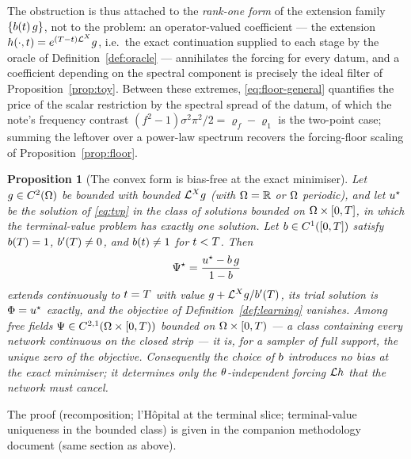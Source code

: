 \documentclass[11pt]{article}
\newcommand{\modeDecayRate}[1]{\varrho_{#1}} %
\theoremstyle{plain}
\newtheorem{proposition}[theorem]{Proposition}
\theoremstyle{definition}
\theoremstyle{remark}
\begin{document}
The obstruction is thus attached to the \emph{rank-one form} of the extension
family $\{b(t)\,g\}$, not to the
problem: an operator-valued coefficient --- the extension
$h(\cdot,t)=e^{(T-t)\mathcal{L}^{X}}g$,
i.e.\ the exact continuation supplied to each stage by the oracle of
Definition~\ref{def:oracle} --- annihilates the forcing for every datum, and a
coefficient depending on the spectral component is precisely the ideal filter of
Proposition~\ref{prop:toy}. Between these extremes, \eqref{eq:floor-general}
quantifies the price of the scalar restriction by the spectral spread of the
datum, of which the note's frequency contrast
$(f^{2}-1)\sigma^{2}\pi^{2}/2=\modeDecayRate{f}-\modeDecayRate{1}$ is the
two-point case; summing the leftover over a power-law spectrum recovers the
forcing-floor scaling of Proposition~\ref{prop:floor}.

\begin{proposition}[The convex form is bias-free at the exact minimiser]\label{prop:nobias}
Let $g\in C^{2}(\Omega)$ be bounded with bounded
$\mathcal{L}^{X}g$ (with $\Omega=\mathbb{R}$ or $\Omega$ periodic), and let
$u^{\star}$ be the solution of \eqref{eq:tvp} in the class of
solutions bounded on $\Omega\times[0,T]$, in which the
terminal-value problem has exactly one solution. Let
$b\in C^{1}([0,T])$ satisfy
$b(T)=1$,
$b'(T)\neq0$, and
$b(t)\neq1$ for $t<T$. Then
\begin{equation*}
  \Psi^{\star}
  =\frac{u^{\star}-b\,g}
        {1-b}
\end{equation*}
extends continuously to $t=T$ with value
$g+\mathcal{L}^{X}g/b'(T)$,
its trial solution is $\Phi=u^{\star}$ exactly, and the
objective of Definition~\ref{def:learning} vanishes. Among free fields
$\Psi\in C^{2,1}(\Omega\times[0,T))$ bounded on
$\Omega\times[0,T)$ --- a class containing every network continuous
on the closed strip --- it is, for a sampler of full support, the unique zero of
the objective.
Consequently the choice of $b$ introduces no bias at the
exact minimiser; it determines only the $\theta$-independent forcing
$\mathcal{L}h$ that the network must cancel.
\end{proposition}
The proof (recomposition; l'H\^{o}pital at the terminal slice; terminal-value
uniqueness in the bounded class) is given in the companion methodology
document (same section as above).
\end{document}
